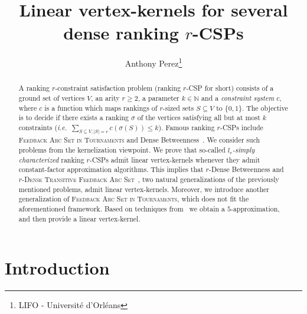 \documentclass[11pt]{article}
\title{Linear vertex-kernels for several dense ranking $r$-CSPs}
\author{Anthony Perez\thanks{LIFO - Universit\'e d'Orl\'eans}}
\date{}
\def\ie{{\em i.e.}~}
\newcommand{\BIT}{{\sc Dense Betweenness}}
\newcommand{\FAST}{\textsc{Feedback Arc Set in Tournaments}}
\newcommand{\rBIT}{{\sc $r$-Dense Betweenness}}
\newcommand{\rFAST}{\textsc{$r$-Dense Transitive Feedback Arc Set}}
\begin{document}
\maketitle

\begin{abstract}

\noindent A {\sc ranking $r$-constraint satisfaction} problem (ranking $r$-CSP for short) consists of a ground set of vertices $V$, an arity 
$r \geqslant 2$, a parameter $k \in \mathbb{N}$ and a \emph{constraint system} $c$, where $c$ is a function which maps 
rankings of $r$-sized sets $S \subseteq V$ to $\{0,1\}$. The objective is to 
decide if there exists a ranking $\sigma$ of the vertices satisfying all but at most $k$ constraints (\ie $\sum_{S \subseteq V, |S| = r} c(\sigma(S)) \leqslant k$). Famous 
ranking $r$-CSPs include \FAST{} and \BIT{}~\cite{ALS09,KS10}. We consider such problems from the kernelization viewpoint.
We prove that so-called \emph{$l_r$-simply characterized} ranking $r$-CSPs admit linear vertex-kernels whenever they admit constant-factor approximation algorithms. This implies that 
\rBIT{} and \rFAST{}~\cite{KS10}, two natural generalizations of the previously mentioned problems, admit linear vertex-kernels. Moreover, we introduce another generalization of \FAST{}, which does not fit the aforementioned framework. Based on techniques from~\cite{CFR06} we obtain a $5$-approximation, and then provide a linear vertex-kernel. 
\end{abstract}

\section*{Introduction}
\label{sec:intro}
\end{document}
